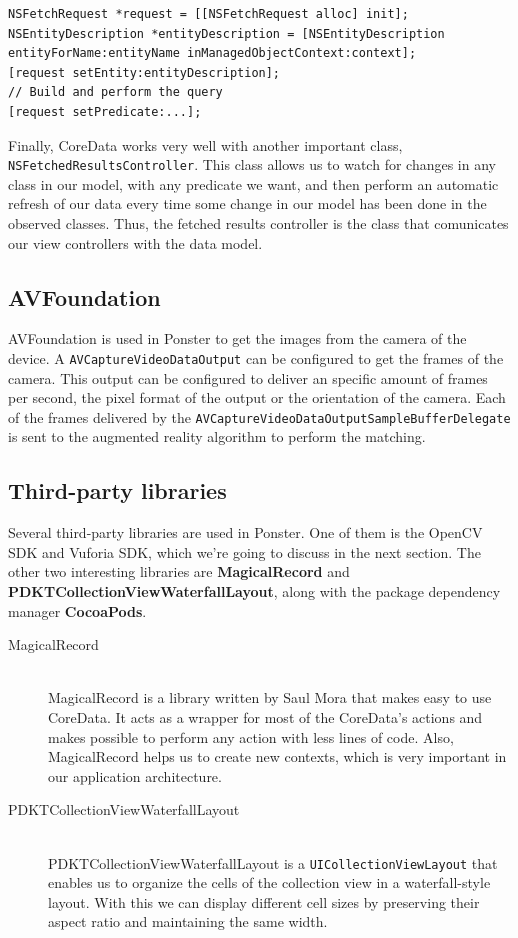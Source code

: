\begin{verbatim}
NSFetchRequest *request = [[NSFetchRequest alloc] init];
NSEntityDescription *entityDescription = [NSEntityDescription
entityForName:entityName inManagedObjectContext:context];
[request setEntity:entityDescription];
// Build and perform the query
[request setPredicate:...];
\end{verbatim}

Finally, CoreData works very well with another important class,
\texttt{NSFetchedResultsController}. This class allows us to watch for changes in
any class in our model, with any predicate we want, and then perform an automatic
refresh of our data every time some change in our model has been done in the
observed classes. Thus, the fetched results controller is the class that comunicates
our view controllers with the data model.

\subsection{AVFoundation}
AVFoundation is used in Ponster to get the images from the camera of the device. A
\texttt{AVCaptureVideoDataOutput} can be configured to get the frames of the
camera. This output can be configured to deliver an specific amount of frames per
second, the pixel format of the output or the orientation of the camera. Each of the
frames delivered by the \texttt{AVCaptureVideoDataOutputSampleBufferDelegate} is
sent to the augmented reality algorithm to perform the matching.

\subsection{Third-party libraries}
Several third-party libraries are used in Ponster. One of them is the OpenCV SDK and
Vuforia SDK, which we're going to discuss in the next section. The other two
interesting libraries are \textbf{MagicalRecord} and
\textbf{PDKTCollectionViewWaterfallLayout}, along with the package dependency
manager \textbf{CocoaPods}.

\begin{description}
\item [MagicalRecord] \hfill \\
MagicalRecord\cite{gh:mr} is a library written by Saul Mora that makes easy to use
CoreData. It acts as a wrapper for most of the CoreData's actions and makes possible
to perform any action with less lines of code. Also, MagicalRecord helps us to create new
contexts, which is very important in our application architecture.
\item [PDKTCollectionViewWaterfallLayout] \hfill \\
PDKTCollectionViewWaterfallLayout is a \texttt{UICollectionViewLayout} that enables
us to organize the cells of the collection view in a waterfall-style layout. With
this we can display different cell sizes by preserving their aspect ratio and
maintaining the same width.
\end{description}

